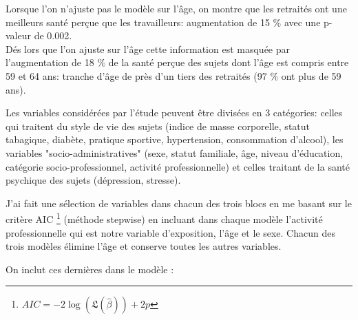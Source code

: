 \documentclass{book}
\begin{document}
\begin{longtable}{lccc|ccc}
 
    \hline
    \end{longtable} 

\noindent
Lorsque l'on n'ajuste pas le modèle sur l'âge, on montre que les retraités ont une meilleurs santé perçue que les travailleurs: augmentation de 15 $\%$ avec une p-valeur de 0.002.\\
Dés lors que l'on ajuste sur l'âge cette information est masquée par l'augmentation de 18 $\%$ de la santé perçue des sujets dont l'âge est compris entre 59 et 64 ans: tranche d'âge de près d'un tiers des retraités (97 $\%$ ont plus de 59 ans).

\bigskip

\noindent
Les variables considérées par l'étude peuvent être divisées en 3 catégories: celles qui traitent du style de vie des sujets (indice de masse corporelle, statut tabagique, diabète, pratique sportive, hypertension, consommation d'alcool), les variables "socio-administratives" (sexe, statut familiale, âge, niveau d'éducation, catégorie socio-professionnel, activité professionnelle) et celles traitant de la santé psychique des sujets (dépression, stresse).

\bigskip

\noindent
J'ai fait une sélection de variables dans chacun des trois blocs en me basant sur le critère AIC \footnote{$AIC = -2 \log \left( \mathfrak{L} (\hat{\beta}) \right) + 2p $} (méthode stepwise) en incluant dans chaque modèle l'activité professionnelle qui est notre variable d'exposition, l'âge et le sexe. Chacun des trois modèles élimine l'âge et conserve toutes les autres variables.

\bigskip

\noindent
On inclut ces dernières dans le modèle :

\newpage
\end{document}
